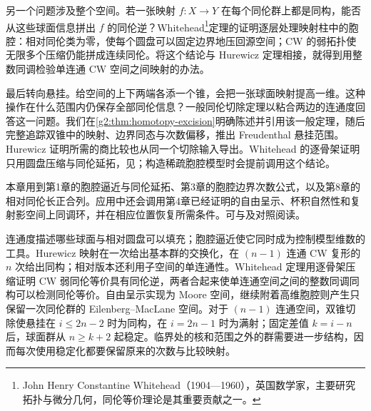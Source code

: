 \ProseParagraphBreak

另一个问题涉及整个空间。若一张映射 \(f:X\to Y\) 在每个同伦群上都是同构，能否从这些球面信息拼出 \(f\) 的同伦逆？Whitehead\footnote{John Henry Constantine Whitehead（1904—1960），英国数学家，主要研究拓扑与微分几何，同伦等价理论是其重要贡献之一。}定理的证明逐层处理映射柱中的胞腔：相对同伦类为零，使每个圆盘可以固定边界地压回源空间；CW 的弱拓扑使无限多个压缩仍能拼成连续同伦。将这个结论与 Hurewicz 定理相接，就得到用整数同调检验单连通 CW 空间之间映射的办法。

\ProseParagraphBreak

最后转向悬挂。给空间的上下两端各添一个锥，会把一张球面映射提高一维。这种操作在什么范围内仍保存全部同伦信息？一般同伦切除定理以粘合两边的连通度回答这一问题。我们在\cref{g2:thm:homotopy-excision}明确陈述并引用该一般定理，随后完整追踪双锥中的映射、边界同态与次数偏移，推出 Freudenthal 悬挂范围。Hurewicz 证明所需的商比较也从同一个切除输入导出。Whitehead 的逐骨架证明只用圆盘压缩与同伦延拓，见；构造稀疏胞腔模型时会提前调用这个结论。

\ProseParagraphBreak

本章用到第1章的胞腔逼近与同伦延拓、第3章的胞腔边界次数公式，以及第8章的相对同伦长正合列。应用中还会调用第4章已经证明的自由呈示、杯积自然性和复射影空间上同调环，并在相应位置恢复所需条件。可与\cite[第4.1节，Whitehead's Theorem；第4.2节]{Hatcher2002}及\cite[第15章，第1节]{May1999}对照阅读。







\begin{chaptersummary}
	连通度描述哪些球面与相对圆盘可以填充；胞腔逼近使它同时成为控制模型维数的工具。Hurewicz 映射在一次给出基本群的交换化，在 \((n-1)\) 连通 CW 复形的 \(n\) 次给出同构；相对版本还利用子空间的单连通性。Whitehead 定理用逐骨架压缩证明 CW 弱同伦等价具有同伦逆，两者合起来使单连通空间之间的整数同调同构可以检测同伦等价。自由呈示实现为 Moore 空间，继续附着高维胞腔则产生只保留一次同伦群的 Eilenberg–MacLane 空间。对于 \((n-1)\) 连通空间，双锥切除使悬挂在 \(i\le2n-2\) 时为同构，在 \(i=2n-1\) 时为满射；固定差值 \(k=i-n\) 后，球面群从 \(n\ge k+2\) 起稳定。临界处的核和范围之外的群需要进一步结构，因而每次使用稳定化都要保留原来的次数与比较映射。
\end{chaptersummary}

\BookExercises

